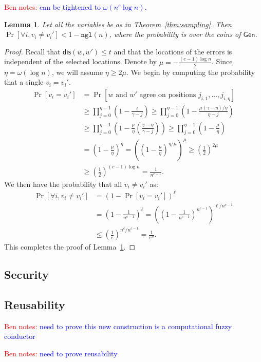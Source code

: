 \documentclass[11pt]{article}
\newcommand{\thref}[1]{\mbox{Theorem~\ref{#1}}}
\newcommand{\lemref}[1]{\mbox{Lemma~\ref{#1}}}
\newcommand{\class}[1]{{\ensuremath{\mathsf{#1}}}}
\newcommand{\gen}{\ensuremath{\class{Gen}}\xspace}
\newcommand{\dis}{\ensuremath{\mathsf{dis}}}
\newcommand{\ngl}{\ensuremath{\mathtt{ngl}}\xspace}
\newtheorem{lemma}[theorem]{Lemma}
\newcommand{\authnote}[2]{{\textcolor{red}{\textsf{#1 notes: }\textcolor{blue}{ #2}}\marginpar{\textcolor{red}{\textbf{!!!!!}}}}}
\newcommand{\authnote}[2]{}
\newcommand{\bnote}[1]{{\authnote{Ben}{#1}}}
\begin{document}
\bnote{can be tightened to $\omega(n^c \log n)$.}

\begin{lemma}
\label{lem:sampling errors}
Let all the variables be as in \thref{thm:sampling}.
 Then $\Pr[\forall i, v_i\neq v_i'] <1 - \ngl(n)$, where the probability is over the coins of $\gen$.  
\end{lemma}
\begin{proof}
Recall that $\dis(w, w')\leq t$ and that the locations of the errors is independent of the selected locations.  Denote by $\mu = -\frac{(c-1)\log n}{2}$.  Since $\eta = \omega(\log n)$, we will assume
$\eta\ge 2\mu$.  We begin by computing the probability that a single $v_i = v_i'$.  
\begin{align*}
\Pr[v_i = v_i'] &= \Pr[w\text{ and }w'\text{ agree on positions }j_{i,1},..., j_{i,\eta}]\\
&\ge \prod_{j=0}^{\eta-1} \left( 1- \frac{t}{\gamma -j }\right) \ge \prod_{j=0}^{\eta-1}\left(1-\frac{\mu(\gamma-\eta)/\eta}{\eta-j}\right)\\
&\ge \prod_{j=0}^{\eta-1} \left( 1- \frac{\mu}{\eta}\left(\frac{\gamma-\eta}{\gamma -j }\right)\right)\ge \prod_{j=0}^{\eta-1}\left(1-\frac{\mu}{\eta}\right)\\
&= \left(1-\frac{\mu}{\eta}\right)^{\eta} =\left( \left(1-\frac{\mu}{\eta}\right)^{\eta/\mu}\right)^\mu\geq \left(\frac{1}{2}\right)^{2\mu}\\
&\ge \left(\frac{1}{2}\right)^{(c-1) \log n}= \frac{1}{n^{c-1}}.
\end{align*}
We then have the probability that all $v_i\neq v_i'$ as:
\begin{align*}
\Pr[\forall i, v_i \neq v_i'] &= \left(1-\Pr[v_i= v_i']\right)^\ell\\
&=\left( 1- \frac{1}{n^{c-1}}\right)^\ell =\left(\left( 1- \frac{1}{n^{c-1}}\right)^{n^{c-1}}\right)^{\ell /n^{c-1}}\\
&\le \left(\frac{1}{e}\right)^{n^c/n^{c-1}} = \frac{1}{e^n}.
\end{align*}
This completes the proof of \lemref{lem:sampling errors}.
\end{proof}

\subsection{Security}

\subsection{Reusability}

\bnote{need to prove this new construction is a computational fuzzy conductor}

\bnote{need to prove reusability}



\end{document}
